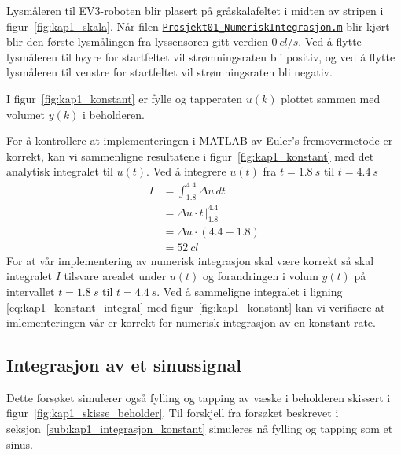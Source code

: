 \documentclass[main.tex]{subfiles}
\begin{document}


Lysmåleren til \textsc{EV3}-roboten blir plasert på gråskalafeltet i midten av stripen i figur~\ref{fig:kap1_skala}. Når filen \href{https://github.com/solbero/lego-project/blob/main/src/Prosjekt01_NumeriskIntegrasjon/Prosjekt01_NumeriskIntegrasjon.m}{\texttt{Prosjekt01\_NumeriskIntegrasjon.m}} blir kjørt blir den første lysmålingen fra lyssensoren gitt verdien $\SI{0}{cl/s}$. Ved å flytte lysmåleren til høyre for startfeltet vil strømningsraten bli positiv, og ved å flytte lysmåleren til venstre for startfeltet vil strømningsraten bli negativ.

I figur~\ref{fig:kap1_konstant} er fylle og tapperaten $u(k)$ plottet sammen med volumet $y(k)$ i beholderen.



For å kontrollere at implementeringen i \textsc{MATLAB} av Euler's fremovermetode er korrekt, kan vi sammenligne resultatene i figur~\ref{fig:kap1_konstant} med det analytisk integralet til $u(t)$. Ved å integrere $u(t)$ fra $t = \SI{1.8}{s}$ til $t = \SI{4.4}{s}$
\begin{align}
    I & = \int_{1.8}^{4.4} \Delta u \, dt \nonumber       \\
      & = \Delta u \cdot t \, \Big|_{1.8}^{4.4} \nonumber \\
      & = \Delta u \cdot (4.4 - 1.8) \nonumber            \\
      & = \SI{52}{cl} \label{eq:kap1_konstant_integral}
\end{align}
For at vår implementering av numerisk integrasjon skal være korrekt så skal integralet $I$ tilsvare arealet under $u(t)$ og forandringen i volum $y(t)$ på intervallet $t = \SI{1.8}{s}$ til $t = \SI{4.4}{s}$. Ved å sammeligne integralet i ligning \eqref{eq:kap1_konstant_integral} med figur~\ref{fig:kap1_konstant} kan vi verifisere at imlementeringen vår er korrekt for numerisk integrasjon av en konstant rate.

\subsection{Integrasjon av et sinussignal}

Dette forsøket simulerer også fylling og tapping av væske i beholderen skissert i figur~\ref{fig:kap1_skisse_beholder}. Til forskjell fra forsøket beskrevet i seksjon~\ref{sub:kap1_integrasjon_konstant} simuleres nå fylling og tapping som et sinus.
\end{document}
